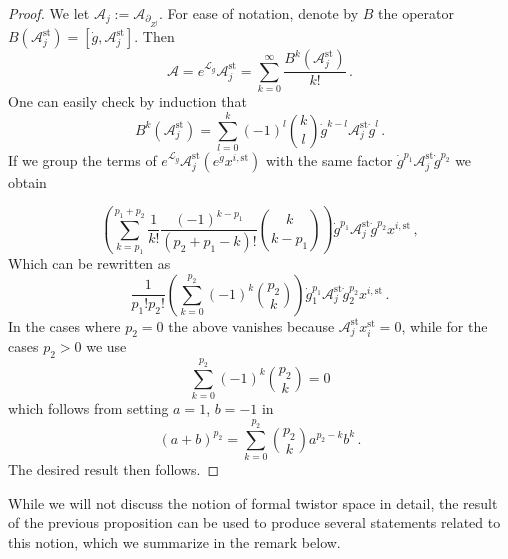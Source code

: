 \documentclass{article}
\theoremstyle{definition}
\numberwithin{equation}{section}
\begin{document}
\begin{proof}
    We let $\mathcal{A}_j:=\mathcal{A}_{\partial_{Z^j}}$.
    For ease of notation, denote by $B$ the operator $B(\mathcal{A}_j^{\text{st}})=[\dot{g},\mathcal{A}_j^{\text{st}}]$. Then 
    \begin{equation*}
        \mathcal{A}=e^{\mathcal{L}_{\dot{g}}}\mathcal{A}^{\text{st}}_j=\sum_{k=0}^{\infty}\frac{B^k(\mathcal{A}^{\text{st}}_j)}{k!}\,.
    \end{equation*}
    One can easily check by induction that 
    \begin{equation*}
        B^k(\mathcal{A}_j^{\text{st}})=\sum_{l=0}^{k}(-1)^{l}\binom{k}{l}\dot{g}^{k-l}\mathcal{A}^{\text{st}}_j\dot{g}^l\,.
    \end{equation*}
    If we group the terms of $e^{\mathcal{L}_{\dot{g}}}\mathcal{A}_j^{\text{st}}(e^{\dot{g}}x^{i,\text{st}})$ with the same factor $\dot{g}^{p_1}\mathcal{A}^{\text{st}}_j\dot{g}^{p_2}$ we obtain

    \begin{equation*}
        \left(\sum_{k=p_1}^{p_1+p_2}\frac{1}{k!}\frac{(-1)^{k-p_1}}{(p_2+p_1-k)!}\binom{k}{k-p_1}\right)\dot{g}^{p_1}\mathcal{A}^{\text{st}}_j\dot{g}^{p_2}x^{i,\text{st}}\,,
    \end{equation*}
    Which can be rewritten as
    \begin{equation*}
        \frac{1}{p_1!p_2!}\left(\sum_{k=0}^{p_2}(-1)^k\binom{p_2}{k}\right)\dot{g}_1^{p_1}\mathcal{A}_j^{\text{st}}\dot{g}_2^{p_2}x^{i,\text{st}}\,.
    \end{equation*}
    In the cases where $p_2=0$ the above vanishes because $\mathcal{A}^{\text{st}}_jx_i^{\text{st}}=0$, while for the cases $p_2>0$ we use
    \begin{equation*}
        \sum_{k=0}^{p_2}(-1)^k\binom{p_2}{k}=0
    \end{equation*}
    which follows from setting $a=1$, $b=-1$ in 
\begin{equation*}
    (a+b)^{p_2}=\sum_{k=0}^{p_2}\binom{p_2}{k}a^{p_2-k}b^k\,.
\end{equation*}
The desired result then follows.
\end{proof}
While we will not discuss the notion of formal twistor space in detail,  the result of the previous proposition can be used to produce several statements related to this notion, which we summarize in the remark below. 
\end{document}
